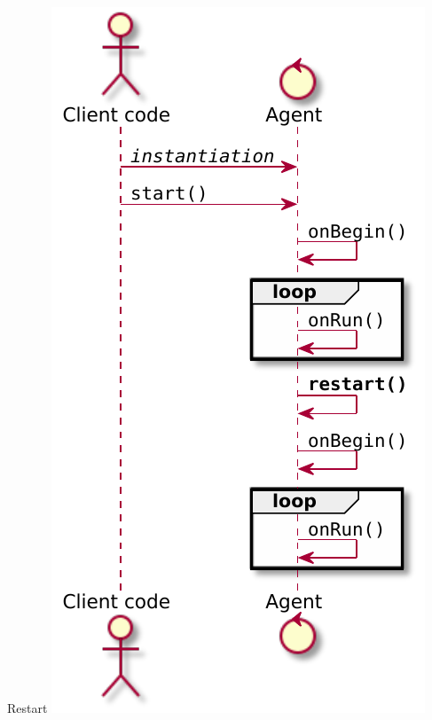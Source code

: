 \documentclass[presentation]{beamer}\mode<presentation>{\usetheme{AMSCesenaPurpleAndGold}}
\begin{document}
\begin{frame}{Restart}\centering
    \includegraphics[height=.8\textheight]{img/restarted-flow.pdf}
\end{frame}
\end{document}
